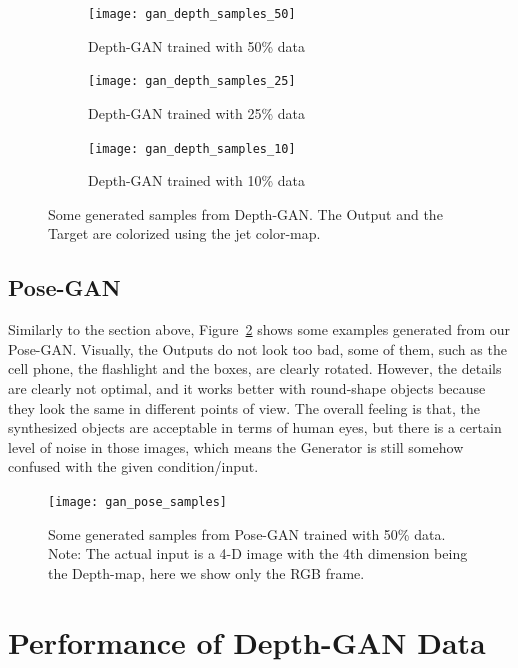 \begin{figure}[h!]
	\centering
	\begin{subfigure}{0.8\textwidth}
		\texttt{[image: gan\_depth\_samples\_50]}
		\caption{Depth-GAN trained with 50\% data} 
	\end{subfigure}
	\begin{subfigure}{0.49\textwidth}
		\texttt{[image: gan\_depth\_samples\_25]}
		\caption{Depth-GAN trained with 25\% data} 
	\end{subfigure}
	\begin{subfigure}{0.49\textwidth}
		\texttt{[image: gan\_depth\_samples\_10]}
		\caption{Depth-GAN trained with 10\% data} 
	\end{subfigure}
	
	\caption{Some generated samples from Depth-GAN. The Output and the Target are colorized using the jet color-map.}
	\label{fig:gan_depth}
\end{figure}

\subsection{Pose-GAN}
\label{sub:pose_gan}

Similarly to the section above, Figure~\ref{fig:gan_pose_samples} shows some examples
generated from our Pose-GAN. Visually, the Outputs do not look too bad, some of them, such
as the cell phone, the flashlight and the boxes, are clearly rotated. However, the details
are clearly not optimal, and it works better with round-shape objects because they look
the same in different points of view. The overall feeling is that, the synthesized objects
are acceptable in terms of human eyes, but there is a certain level of noise in those
images, which means the Generator is still somehow confused with the given
condition/input.

\begin{figure}[h!]
	\centering
	\texttt{[image: gan\_pose\_samples]}
	\caption{Some generated samples from Pose-GAN trained with 50\% data. Note: The actual
		input is a 4-D image with the 4th dimension being the Depth-map, here we show only the
	RGB frame.}
	\label{fig:gan_pose_samples}
\end{figure}

\section{Performance of Depth-GAN Data}

